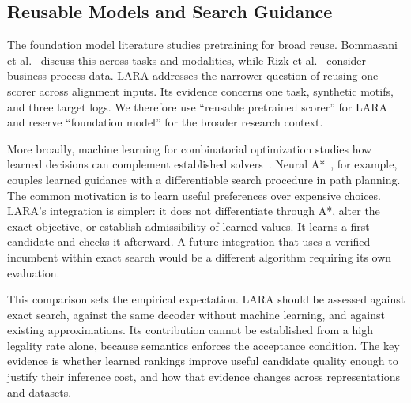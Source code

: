 \subsection{Reusable Models and Search Guidance}

\begin{revised}The foundation model literature studies pretraining for broad reuse. Bommasani et al.~\cite{Bommasani2021} discuss this across tasks and modalities, while Rizk et al.~\cite{Rizk2024} consider business process data. LARA addresses the narrower question of reusing one scorer across alignment inputs. Its evidence concerns one task, synthetic motifs, and three target logs. We therefore use ``reusable pretrained scorer'' for LARA and reserve ``foundation model'' for the broader research context.\end{revised}

More broadly, machine learning for combinatorial optimization studies how learned decisions can complement established solvers~\cite{Bengio2021}. Neural A*~\cite{Yonetani2021}, for example, couples learned guidance with a differentiable search procedure in path planning. The common motivation is to learn useful preferences over expensive choices. LARA's integration is simpler: it does not differentiate through A*, alter the exact objective, or establish admissibility of learned values. It learns a first candidate and checks it afterward. A future integration that uses a verified incumbent within exact search would be a different algorithm requiring its own evaluation.


This comparison sets the empirical expectation. LARA should be assessed against exact search, against the same decoder without machine learning, and against existing approximations. Its contribution cannot be established from a high legality rate alone, because semantics enforces the acceptance condition. The key evidence is whether learned rankings improve useful candidate quality enough to justify their inference cost, and how that evidence changes across representations and datasets.

